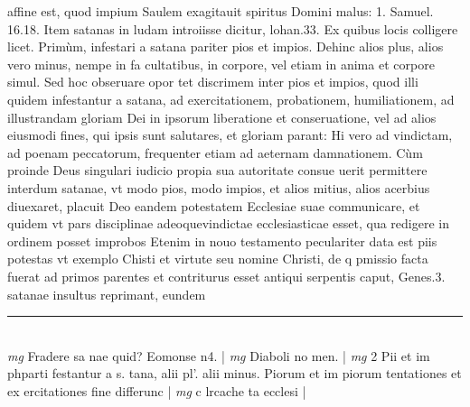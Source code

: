 \documentclass{article}
\begin{document}
\begin{pages}
affine est, quod impium Saulem exagitauit spiritus Domini malus: 1. Samuel. 16.18. Item satanas in ludam introiisse dicitur, lohan.33. Ex quibus locis colligere licet. Primùm, infestari a satana pariter pios et impios. Dehinc alios plus, alios vero minus, nempe in fa cultatibus, in corpore, vel etiam in anima et corpore simul. Sed hoc obseruare opor tet discrimem inter pios et impios, quod illi quidem infestantur a satana, ad exercitationem, probationem, humiliationem, ad illustrandam gloriam Dei in ipsorum liberatione et conseruatione, vel ad alios eiusmodi fines, qui ipsis sunt salutares, et gloriam parant: Hi vero ad vindictam, ad poenam peccatorum, frequenter etiam ad aeternam damnationem. Cùm proinde Deus singulari iudicio propia sua autoritate consue uerit permittere interdum satanae, vt modo pios, modo impios, et alios mitius, alios acerbius diuexaret, placuit Deo eandem potestatem Ecclesiae suae communicare, et quidem vt pars disciplinae adeoquevindictae ecclesiasticae esset, qua redigere in ordinem posset improbos Etenim in nouo testamento peculariter data est piis potestas vt exemplo Chisti et virtute seu nomine Christi, de q pmissio facta fuerat ad primos parentes et contriturus esset antiqui serpentis caput, Genes.3. satanae insultus reprimant, eundem  \pend
\vspace{0.5cm}\noindent
\vspace{0.2cm}\rule{1cm}{0.2pt}\\ 
\hspace{0.2cm}\textit{mg}
\footnotesize Fradere sa nae quid? Eomonse n4. 
\normalsize| 
\hspace{0.2cm}\textit{mg}
\footnotesize Diaboli no men. 
\normalsize| 
\hspace{0.2cm}\textit{mg}
\footnotesize 2 Pii et im phparti festantur a s. tana, alii pl'. alii minus. Piorum et im piorum tentationes et ex ercitationes fine differunc 
\normalsize| 
\hspace{0.2cm}\textit{mg}
\footnotesize c lrcache ta ecclesi
\normalsize| 

\end{pages}
\end{document}
